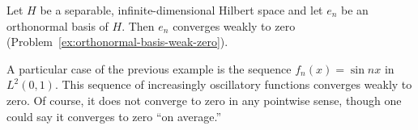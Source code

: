 \begin{Example}
\label{ex:orthonormal-basis-weak-zero-example}
Let $H$ be a separable, infinite-dimensional Hilbert space and let $e_n$ be an orthonormal basis of $H$. Then $e_n$ converges weakly to zero (Problem~\ref{ex:orthonormal-basis-weak-zero}).
\end{Example}

\begin{Example}
\label{ex:oscillatory-sines-weak-zero}
A particular case of the previous example is the sequence $f_n(x)=\sin nx$ in $L^2(0,1)$. This sequence of increasingly oscillatory functions converges weakly to zero. Of course, it does not converge to zero in any pointwise sense, though one could say it converges to zero ``on average.''
\end{Example}
